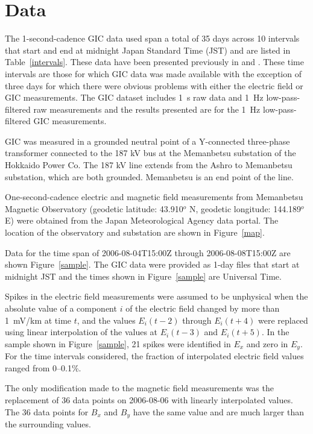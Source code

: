 \documentclass[draft,linenumbers]{agujournal2018}
\begin{document}
\section{Data}

The 1-second-cadence GIC data used span a total of 35 days across 10 intervals that start and end at midnight Japan Standard Time (JST) and are listed in Table~\ref{intervals}. These data have been presented previously in \citet{Watari2009} and \cite{Watari2015}. These time intervals are those for which GIC data was made available with the exception of three days for which there were obvious problems with either the electric field or GIC measurements. The GIC dataset includes 1~s raw data and 1~Hz low-pass-filtered raw measurements and the results presented are for the 1~Hz low-pass-filtered GIC measurements.

GIC was measured in a grounded neutral point of a Y-connected three-phase transformer connected to the 187 kV bus at the Memanbetsu substation of the Hokkaido Power Co. The 187 kV line extends from the Ashro to Memanbetsu substation, which are both grounded. Memanbetsu is an end point of the line.

One-second-cadence electric and magnetic field measurements from Memanbetsu Magnetic Observatory (geodetic latitude: 43.910$^o$ N, geodetic longitude: 144.189$^o$ E) were obtained from the Japan Meteorological Agency data portal. The location of the observatory and substation are shown in Figure~\ref{map}.

Data for the time span of 2006-08-04T15:00Z through 2006-08-08T15:00Z are shown Figure~\ref{sample}. The GIC data were provided as 1-day files that start at midnight JST and the times shown in Figure~\ref{sample} are Universal Time.

Spikes in the electric field measurements were assumed to be unphysical when the absolute value of a component $i$ of the electric field changed by more than 1~mV/km at time $t$, and the values $E_i(t-2)$ through $E_i(t+4)$ were replaced using linear interpolation of the values at $E_i(t-3)$ and $E_i(t + 5)$. In the sample shown in Figure~\ref{sample}, 21 spikes were identified in $E_x$ and zero in $E_y$. For the time intervals considered, the fraction of interpolated electric field values ranged from 0--0.1\%.

The only modification made to the magnetic field measurements was the replacement of 36 data points on 2006-08-06 with linearly interpolated values. The 36 data points for $B_x$ and $B_y$ have the same value and are much larger than the surrounding values.
\end{document}
